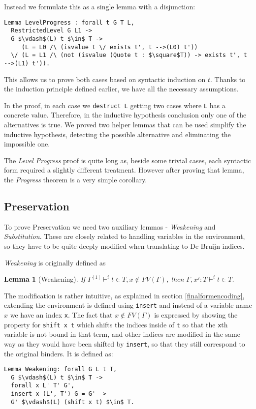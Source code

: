 \documentclass[runningheads]{article}
\newtheorem*{lemma}{Lemma}
\begin{document}
Instead we formulate this as a single lemma with a disjunction:
\begin{lstlisting}[mathescape=true]
Lemma LevelProgress : forall t G T L,
  RestrictedLevel G L1 ->
  G $\vdash$(L) t $\in$ T ->
     (L = L0 /\ (isvalue t \/ exists t', t -->(L0) t')) 
  \/ (L = L1 /\ (not (isvalue (Quote t : $\square$T)) -> exists t', t -->(L1) t')).
\end{lstlisting}

This allows us to prove both cases based on syntactic induction on $t$. Thanks to the induction principle defined earlier, we have all the necessary assumptions.

In the proof, in each case we \verb|destruct L| getting two cases where \verb|L| has a concrete value. Therefore, in the inductive hypothesis conclusion only one of the alternatives is true. We proved two helper lemmas that can be used simplify the inductive hypothesis, detecting the possible alternative and eliminating the impossible one.

The \textit{Level Progress} proof is quite long as, beside some trivial cases, each syntactic form required a slightly different treatment. However after proving that lemma, the \textit{Progress} theorem is a very simple corollary.

\subsection{Preservation}

To prove Preservation we need two auxiliary lemmas - \textit{Weakening} and \textit{Substitution}. These are closely related to handling variables in the environment, so they have to be quite deeply modified when translating to De Bruijn indices.

\textit{Weakening} is originally defined as 
\begin{lemma}[Weakening]
If $\Gamma^{[1]} \vdash^i t \in T, x \not\in FV(\Gamma)$, then $\Gamma, x^j : T \vdash^i t \in T$.
\end{lemma}

The modification is rather intuitive, as explained in section \ref{finalformencoding}, extending the environment is defined using \verb|insert| and instead of a variable name $x$ we have an index \verb|x|. The fact that $x \not\in FV(\Gamma)$ is expressed by showing the property for \verb|shift x t| which shifts the indices inside of \verb|t| so that the \verb|x|th variable is not bound in that term, and other indices are modified in the same way as they would have been shifted by \verb|insert|, so that they still correspond to the original binders. It is defined as:
\begin{lstlisting}[mathescape=true]
Lemma Weakening: forall G L t T,
  G $\vdash$(L) t $\in$ T ->
  forall x L' T' G',
  insert x (L', T') G = G' ->
  G' $\vdash$(L) (shift x t) $\in$ T.
\end{lstlisting}
\end{document}
